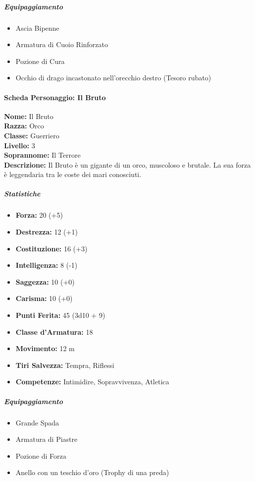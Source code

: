 \documentclass{article}
\begin{document}
                      \subparagraph*{Equipaggiamento}
\begin{itemize}
  \item Ascia Bipenne
  \item Armatura di Cuoio Rinforzato
  \item Pozione di Cura
  \item Occhio di drago incastonato nell'orecchio destro (Tesoro rubato)
\end{itemize}

                  \paragraph*{Scheda Personaggio: Il Bruto}

\textbf{Nome:} Il Bruto \\
\textbf{Razza:} Orco \\
\textbf{Classe:} Guerriero \\
\textbf{Livello:} 3 \\
\textbf{Soprannome:} Il Terrore \\
\textbf{Descrizione:} Il Bruto è un gigante di un orco, muscoloso e brutale. La sua forza è leggendaria tra le coste dei mari conosciuti. 

                      \subparagraph*{Statistiche}

\begin{itemize}
  \item \textbf{Forza:} 20 (+5)
  \item \textbf{Destrezza:} 12 (+1)
  \item \textbf{Costituzione:} 16 (+3)
  \item \textbf{Intelligenza:} 8 (-1)
  \item \textbf{Saggezza:} 10 (+0)
  \item \textbf{Carisma:} 10 (+0)
\end{itemize}

\begin{itemize}
  \item \textbf{Punti Ferita:} 45 (3d10 + 9)
  \item \textbf{Classe d'Armatura:} 18
  \item \textbf{Movimento:} 12 m
  \item \textbf{Tiri Salvezza:} Tempra, Riflessi
  \item \textbf{Competenze:} Intimidire, Sopravvivenza, Atletica
\end{itemize}


                      \subparagraph*{Equipaggiamento}
\begin{itemize}
  \item Grande Spada
  \item Armatura di Piastre
  \item Pozione di Forza
  \item Anello con un teschio d'oro (Trophy di una preda)
\end{itemize}
\end{document}
